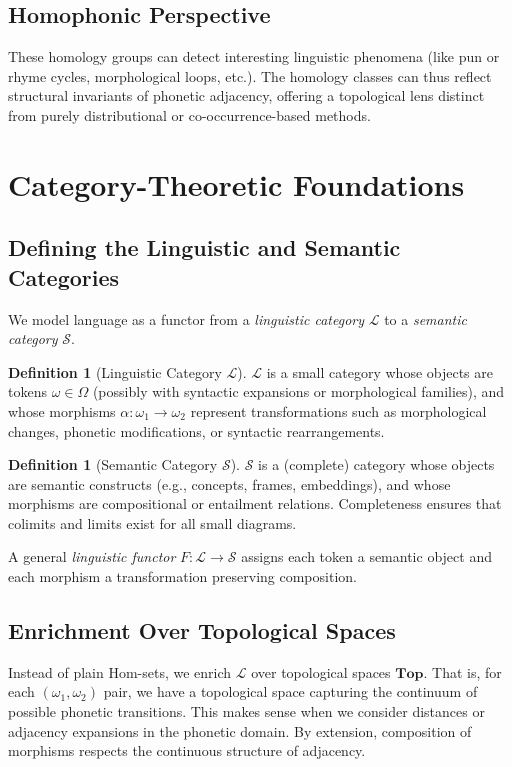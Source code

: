 \documentclass[11pt]{article}
\theoremstyle{definition}
\newtheorem{definition}[theorem]{Definition}
\theoremstyle{remark}
\begin{document}
\subsection{Homophonic Perspective}
These homology groups can detect interesting linguistic phenomena (like pun or rhyme cycles, morphological loops, etc.). The homology classes can thus reflect structural invariants of phonetic adjacency, offering a topological lens distinct from purely distributional or co-occurrence-based methods.

\section{Category-Theoretic Foundations}
\label{sec:cat-theory}

\subsection{Defining the Linguistic and Semantic Categories}
We model language as a functor from a \emph{linguistic category} \(\mathcal{L}\) to a \emph{semantic category} \(\mathcal{S}\).

\begin{definition}[Linguistic Category \(\mathcal{L}\)]
\(\mathcal{L}\) is a small category whose objects are tokens \(\omega \in \Omega\) (possibly with syntactic expansions or morphological families), and whose morphisms \(\alpha: \omega_1 \to \omega_2\) represent transformations such as morphological changes, phonetic modifications, or syntactic rearrangements.
\end{definition}

\begin{definition}[Semantic Category \(\mathcal{S}\)]
\(\mathcal{S}\) is a (complete) category whose objects are semantic constructs (e.g., concepts, frames, embeddings), and whose morphisms are compositional or entailment relations. Completeness ensures that colimits and limits exist for all small diagrams.
\end{definition}

A general \emph{linguistic functor} \(F: \mathcal{L} \to \mathcal{S}\) assigns each token a semantic object and each morphism a transformation preserving composition.

\subsection{Enrichment Over Topological Spaces}
Instead of plain Hom-sets, we enrich \(\mathcal{L}\) over topological spaces \(\mathbf{Top}\). That is, for each \((\omega_1,\omega_2)\) pair, we have a topological space capturing the continuum of possible phonetic transitions. This makes sense when we consider distances or adjacency expansions in the phonetic domain. By extension, composition of morphisms respects the continuous structure of adjacency.
\end{document}
